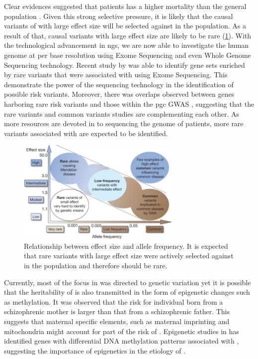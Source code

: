\documentclass[12pt]{scrbook}
\newcommand*{\glng}{\glsentrylong}
\begin{document}
	Clear evidences suggested that \glng{scz} patients has a higher mortality than the general population \citep{Saha2007}.
	Given this strong selective pressure, it is likely that the causal variants of \glng{scz} with large effect size will be selected against in the population. 
	As a result of that, causal variants with large effect size are likely to be rare (\cref{fig:effectSize}).
	With the technological advancement in \gls{ngs}, we are now able to investigate the human genome at per base resolution using Exome Sequencing and even Whole Genome Sequencing technology.
	Recent study by \citet{Purcell2014} was able to identify gene sets enriched by rare variants that were associated with \glng{scz} using Exome Sequencing. 
	This demonstrate the power of the sequencing technology in the identification of possible risk variants. 
	Moreover, there was overlaps observed between genes harboring rare risk variants and those within the \gls{pgc} \glng{scz} \gls{GWAS} \citep{Purcell2014}, suggesting that the rare variants and common variants studies are complementing each other.
	As more resources are devoted in to sequencing the genome of \glng{scz} patients, more rare variants associated with \glng{scz} are expected to be identified.
	\begin{figure}
		\centering
		\includegraphics[width=0.7\textwidth]{figure/maf_effectSize.png}
		\caption[Relationship between Effect Size and Allele Frequency]{
			Relationship between effect size and allele frequency. 
			It is expected that rare variants with large effect size were actively selected against in the population and therefore should be rare.
		}
		\label{fig:effectSize}
	\end{figure}
	
	Currently, most of the focus in \glng{scz} was directed to genetic variation yet it is possible that the heritability of \glng{scz} is also transmitted in the form of epigenetic changes such as methylation.
	It was observed that the risk for individual born from a schizophrenic mother is larger than that from a schizophrenic father. 
	This suggests that maternal specific elements, such as maternal imprinting and mitochondria might account for part of the risk of \glng{scz}. 
	Epigenetic studies in \glng{scz} \citep{Wockner2014,Nishioka2012} has identified genes with differential DNA methylation patterns associated with \glng{scz}, suggesting the importance of epigenetics in the etiology of \glng{scz}.
	
\end{document}
